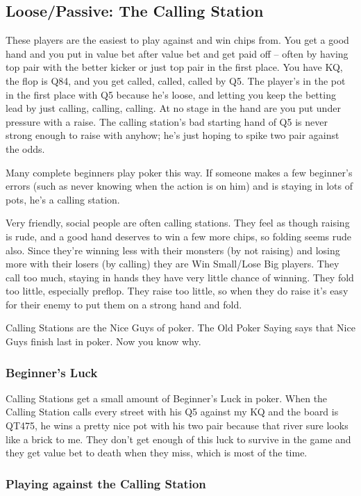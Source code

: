 \subsection{Loose/Passive: The Calling Station}

These players are the easiest to play against and win chips from.
You get a good hand and you put in value bet after value bet and
get paid off -- often by having top pair with the better kicker or
just top pair in the first place. You have KQ, the flop is Q84, and
you get called, called, called by Q5. The player's in the pot in the
first place with Q5 because he's loose, and letting you keep the
betting lead by just calling, calling, calling. At no stage in
the hand are you put under pressure with a raise. The calling
station's bad starting hand of Q5 is never strong enough to raise with
anyhow; he's just hoping to spike two pair against the odds.

Many complete beginners play poker this way. If someone makes
a few beginner's errors (such as never knowing when the action
is on him) and is staying in lots of pots, he's a calling station.

Very friendly, social people are often calling stations.
They feel as though raising is rude, and a good hand deserves
to win a few more chips, so folding seems rude also. Since
they're winning less with their monsters (by not raising)
and losing more with their losers (by calling) they are
Win Small/Lose Big players. They call too much, staying
in hands they have very little chance of winning. They fold
too little, especially preflop. They raise too little, so when
they do raise it's easy for their enemy to put them on a strong hand
and fold.

Calling Stations are the Nice Guys of poker. The Old Poker Saying says
that Nice Guys finish last in poker. Now you know why.

\subsubsection{Beginner's Luck}

Calling Stations get a small amount of Beginner's Luck in poker.
When the Calling Station calls every street with his Q5 against my KQ
and the board is QT475, he wins a pretty nice pot with his two pair
because that river sure looks like a brick to me. They don't get
enough of this luck to survive in the game and they get value bet to
death when they miss, which is most of the time.

\subsubsection{Playing against the Calling Station}

